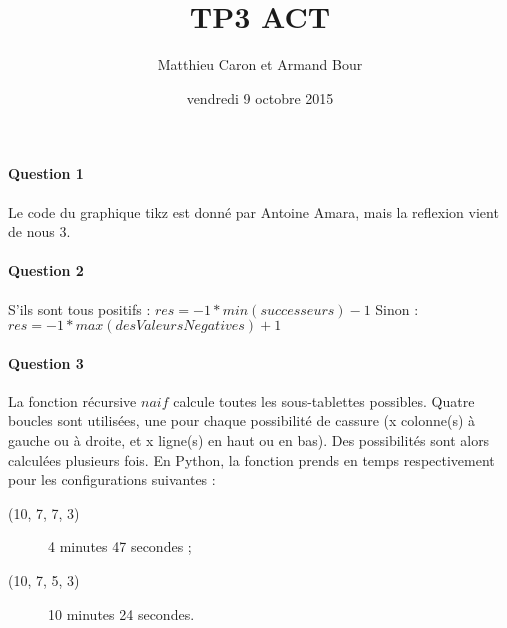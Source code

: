 \documentclass[a4paper,10pt]{article}
\title{TP3 ACT}
\author{Matthieu Caron et Armand Bour}
\date{vendredi 9 octobre 2015}
\begin{document}
\maketitle

\paragraph{Question 1}

Le code du graphique tikz est donné par Antoine Amara, mais la reflexion vient de nous 3.



\paragraph{Question 2}
S’ils sont tous positifs : $res = -1 * min(successeurs)-1$\newline
Sinon : $res = -1*max(desValeursNegatives) + 1$

\paragraph{Question 3}
La fonction récursive $naif$ calcule toutes les sous-tablettes possibles. Quatre boucles sont utilisées, une pour chaque possibilité de cassure (x colonne(s) à gauche ou à droite, et x ligne(s) en haut ou en bas). Des possibilités sont alors calculées plusieurs fois.\newline
En Python, la fonction prends en temps respectivement pour les configurations suivantes :
\begin{description}
\item[(10, 7, 7, 3)] 4 minutes 47 secondes ;
\item[(10, 7, 5, 3)] 10 minutes 24 secondes.
\end{description}
\end{document}
